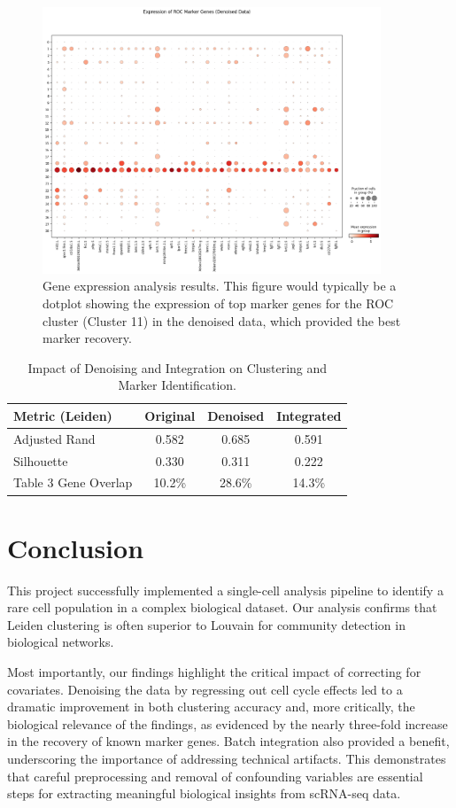 \documentclass[12pt,letterpaper]{article}
\begin{document}
\begin{figure}[H]
    \centering
    \includegraphics[width=0.9\textwidth]{figures/gene_expression_dotplot.png}
    \caption{Gene expression analysis results. This figure would typically be a dotplot showing the expression of top marker genes for the ROC cluster (Cluster 11) in the denoised data, which provided the best marker recovery.}
    \label{fig:gene_expression}
\end{figure}

\begin{table}[H]
\centering
\caption{Impact of Denoising and Integration on Clustering and Marker Identification.}
\begin{tabular}{|l|c|c|c|}
\hline
\textbf{Metric (Leiden)} & \textbf{Original} & \textbf{Denoised} & \textbf{Integrated} \\ \hline
Adjusted Rand & 0.582 & 0.685 & 0.591 \\ \hline
Silhouette & 0.330 & 0.311 & 0.222 \\ \hline
Table 3 Gene Overlap & 10.2\% & 28.6\% & 14.3\% \\ \hline
\end{tabular}
\end{table}

\section{Conclusion}
This project successfully implemented a single-cell analysis pipeline to identify a rare cell population in a complex biological dataset. Our analysis confirms that Leiden clustering is often superior to Louvain for community detection in biological networks.

Most importantly, our findings highlight the critical impact of correcting for covariates. Denoising the data by regressing out cell cycle effects led to a dramatic improvement in both clustering accuracy and, more critically, the biological relevance of the findings, as evidenced by the nearly three-fold increase in the recovery of known marker genes. Batch integration also provided a benefit, underscoring the importance of addressing technical artifacts. This demonstrates that careful preprocessing and removal of confounding variables are essential steps for extracting meaningful biological insights from scRNA-seq data.
\end{document}
